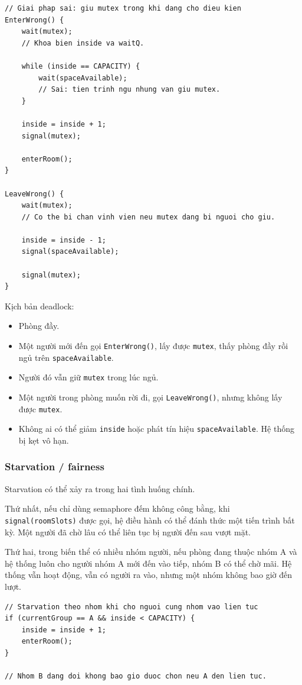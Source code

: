 \begin{lstlisting}
// Giai phap sai: giu mutex trong khi dang cho dieu kien
EnterWrong() {
    wait(mutex);
    // Khoa bien inside va waitQ.

    while (inside == CAPACITY) {
        wait(spaceAvailable);
        // Sai: tien trinh ngu nhung van giu mutex.
    }

    inside = inside + 1;
    signal(mutex);

    enterRoom();
}

LeaveWrong() {
    wait(mutex);
    // Co the bi chan vinh vien neu mutex dang bi nguoi cho giu.

    inside = inside - 1;
    signal(spaceAvailable);

    signal(mutex);
}
\end{lstlisting}

Kịch bản deadlock:

\begin{itemize}
    \item Phòng đầy.
    \item Một người mới đến gọi \texttt{EnterWrong()}, lấy được
    \texttt{mutex}, thấy phòng đầy rồi ngủ trên \texttt{spaceAvailable}.
    \item Người đó vẫn giữ \texttt{mutex} trong lúc ngủ.
    \item Một người trong phòng muốn rời đi, gọi \texttt{LeaveWrong()},
    nhưng không lấy được \texttt{mutex}.
    \item Không ai có thể giảm \texttt{inside} hoặc phát tín hiệu
    \texttt{spaceAvailable}. Hệ thống bị kẹt vô hạn.
\end{itemize}

\subsubsection*{Starvation / fairness}

Starvation có thể xảy ra trong hai tình huống chính.

Thứ nhất, nếu chỉ dùng semaphore đếm không công bằng, khi
\texttt{signal(roomSlots)} được gọi, hệ điều hành có thể đánh thức một
tiến trình bất kỳ. Một người đã chờ lâu có thể liên tục bị người đến sau
vượt mặt.

Thứ hai, trong biến thể có nhiều nhóm người, nếu phòng đang thuộc nhóm A
và hệ thống luôn cho người nhóm A mới đến vào tiếp, nhóm B có thể chờ
mãi. Hệ thống vẫn hoạt động, vẫn có người ra vào, nhưng một nhóm không
bao giờ đến lượt.

\begin{lstlisting}
// Starvation theo nhom khi cho nguoi cung nhom vao lien tuc
if (currentGroup == A && inside < CAPACITY) {
    inside = inside + 1;
    enterRoom();
}

// Nhom B dang doi khong bao gio duoc chon neu A den lien tuc.
\end{lstlisting}

